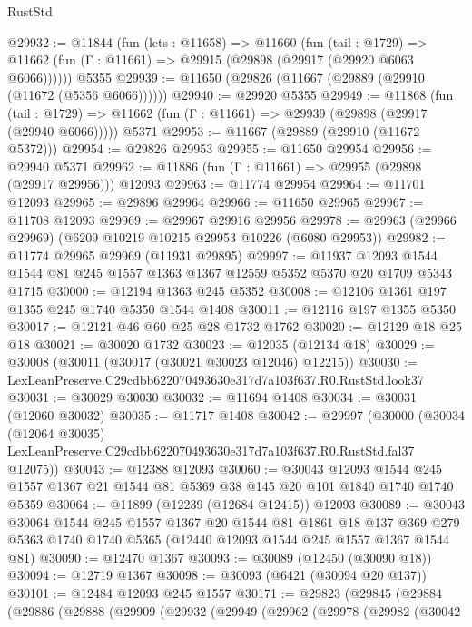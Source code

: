 \begin{lexlean}{RustStd}
\begin{coremodule}
@29932 := @11844
    (fun (lets : @11658) =>
    @11660
      (fun (tail : @1729) =>
      @11662 (fun (Γ : @11661) => @29915 (@29898 (@29917 (@29920 @6063 @6066))))))
    @5355
@29939 := @11650 (@29826 (@11667 (@29889 (@29910 (@11672 (@5356 @6066))))))
@29940 := @29920 @5355
@29949 := @11868
    (fun (tail : @1729) => @11662 (fun (Γ : @11661) => @29939 (@29898 (@29917 (@29940 @6066)))))
    @5371
@29953 := @11667 (@29889 (@29910 (@11672 @5372)))
@29954 := @29826 @29953
@29955 := @11650 @29954
@29956 := @29940 @5371
@29962 := @11886 (fun (Γ : @11661) => @29955 (@29898 (@29917 @29956))) @12093
@29963 := @11774 @29954
@29964 := @11701 @12093
@29965 := @29896 @29964
@29966 := @11650 @29965
@29967 := @11708 @12093
@29969 := @29967 @29916 @29956
@29978 := @29963 (@29966 @29969) (@6209 @10219 @10215 @29953 @10226 (@6080 @29953))
@29982 := @11774 @29965 @29969 (@11931 @29895)
@29997 := @11937
    @12093
    @1544
    @1544
    @81
    @245
    @1557
    @1363
    @1367
    @12559
    @5352
    @5370
    @20
    @1709
    @5343
    @1715
@30000 := @12194 @1363 @245 @5352
@30008 := @12106 @1361 @197 @1355 @245 @1740 @5350 @1544 @1408
@30011 := @12116 @197 @1355 @5350
@30017 := @12121 @46 @60 @25 @28 @1732 @1762
@30020 := @12129 @18 @25 @18
@30021 := @30020 @1732
@30023 := @12035 (@12134 @18)
@30029 := @30008 (@30011 (@30017 (@30021 @30023 @12046) @12215))
@30030 := LexLeanPreserve.C29cdbb622070493630e317d7a103f637.R0.RustStd.look37
@30031 := @30029 @30030
@30032 := @11694 @1408
@30034 := @30031 (@12060 @30032)
@30035 := @11717 @1408
@30042 := @29997
    (@30000
      (@30034
        (@12064 @30035)
        LexLeanPreserve.C29cdbb622070493630e317d7a103f637.R0.RustStd.fal37
        @12075))
@30043 := @12388 @12093
@30060 := @30043
    @12093
    @1544
    @245
    @1557
    @1367
    @21
    @1544
    @81
    @5369
    @38
    @145
    @20
    @101
    @1840
    @1740
    @1740
    @5359
@30064 := @11899 (@12239 (@12684 @12415)) @12093
@30089 := @30043
    @30064
    @1544
    @245
    @1557
    @1367
    @20
    @1544
    @81
    @1861
    @18
    @137
    @369
    @279
    @5363
    @1740
    @1740
    @5365
    (@12440 @12093 @1544 @245 @1557 @1367 @1544 @81)
@30090 := @12470 @1367
@30093 := @30089 (@12450 (@30090 @18))
@30094 := @12719 @1367
@30098 := @30093 (@6421 (@30094 @20 @137))
@30101 := @12484 @12093 @245 @1557
@30171 := @29823
    (@29845
      (@29884
        (@29886
          (@29888
            (@29909
              (@29932
                (@29949
                  (@29962
                    (@29978
                      (@29982
                        (@30042

\end{coremodule}
\end{lexlean}
